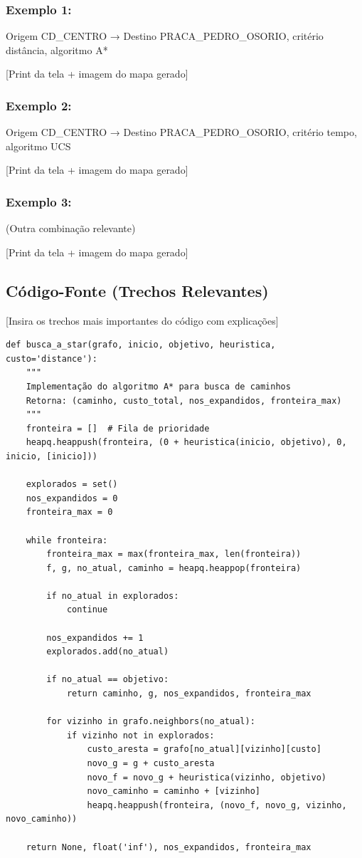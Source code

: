 \documentclass[12pt,a4paper]{article}
\begin{document}
\subsubsection{Exemplo 1:} Origem CD\_CENTRO → Destino PRACA\_PEDRO\_OSORIO, critério distância, algoritmo A*

[Print da tela + imagem do mapa gerado]

\subsubsection{Exemplo 2:} Origem CD\_CENTRO → Destino PRACA\_PEDRO\_OSORIO, critério tempo, algoritmo UCS

[Print da tela + imagem do mapa gerado]

\subsubsection{Exemplo 3:} (Outra combinação relevante)

[Print da tela + imagem do mapa gerado]

\subsection{Código-Fonte (Trechos Relevantes)}
[Insira os trechos mais importantes do código com explicações]

\begin{lstlisting}[caption=Implementação do algoritmo A*]
def busca_a_star(grafo, inicio, objetivo, heuristica, custo='distance'):
    """
    Implementação do algoritmo A* para busca de caminhos
    Retorna: (caminho, custo_total, nos_expandidos, fronteira_max)
    """
    fronteira = []  # Fila de prioridade
    heapq.heappush(fronteira, (0 + heuristica(inicio, objetivo), 0, inicio, [inicio]))
    
    explorados = set()
    nos_expandidos = 0
    fronteira_max = 0
    
    while fronteira:
        fronteira_max = max(fronteira_max, len(fronteira))
        f, g, no_atual, caminho = heapq.heappop(fronteira)
        
        if no_atual in explorados:
            continue
            
        nos_expandidos += 1
        explorados.add(no_atual)
        
        if no_atual == objetivo:
            return caminho, g, nos_expandidos, fronteira_max
        
        for vizinho in grafo.neighbors(no_atual):
            if vizinho not in explorados:
                custo_aresta = grafo[no_atual][vizinho][custo]
                novo_g = g + custo_aresta
                novo_f = novo_g + heuristica(vizinho, objetivo)
                novo_caminho = caminho + [vizinho]
                heapq.heappush(fronteira, (novo_f, novo_g, vizinho, novo_caminho))
    
    return None, float('inf'), nos_expandidos, fronteira_max
\end{lstlisting}
\end{document}
